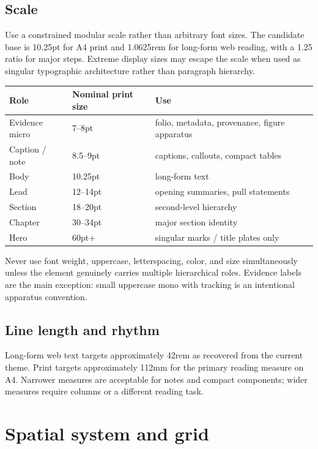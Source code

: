 \documentclass[11pt,twoside,openany]{report}
\begin{document}
\section{Scale}
Use a constrained modular scale rather than arbitrary font sizes. The candidate base is 10.25pt for A4 print and 1.0625rem for long-form web reading, with a 1.25 ratio for major steps. Extreme display sizes may escape the scale when used as singular typographic architecture rather than paragraph hierarchy.

\begin{tabularx}{\textwidth}{@{}L{28mm}L{24mm}Y@{}}
\toprule
Role & Nominal print size & Use\\
\midrule
Evidence micro & 7--8pt & folio, metadata, provenance, figure apparatus\\
Caption / note & 8.5--9pt & captions, callouts, compact tables\\
Body & 10.25pt & long-form text\\
Lead & 12--14pt & opening summaries, pull statements\\
Section & 18--20pt & second-level hierarchy\\
Chapter & 30--34pt & major section identity\\
Hero & 60pt+ & singular marks / title plates only\\
\bottomrule
\end{tabularx}

\begin{specbox}
Never use font weight, uppercase, letterspacing, color, and size simultaneously unless the element genuinely carries multiple hierarchical roles. Evidence labels are the main exception: small uppercase mono with tracking is an intentional apparatus convention.
\end{specbox}

\section{Line length and rhythm}
Long-form web text targets approximately 42rem as recovered from the current theme. Print targets approximately 112mm for the primary reading measure on A4. Narrower measures are acceptable for notes and compact components; wider measures require columns or a different reading task.

\clearpage
\chapter{Spatial system and grid}
\end{document}
